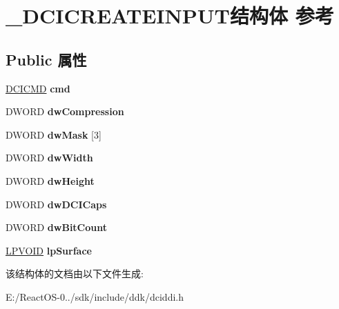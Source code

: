\hypertarget{struct___d_c_i_c_r_e_a_t_e_i_n_p_u_t}{}\section{\+\_\+\+D\+C\+I\+C\+R\+E\+A\+T\+E\+I\+N\+P\+U\+T结构体 参考}
\label{struct___d_c_i_c_r_e_a_t_e_i_n_p_u_t}
\subsection*{Public 属性}
\begin{DoxyCompactItemize}
\item 
\mbox{\label{struct___d_c_i_c_r_e_a_t_e_i_n_p_u_t_ae2fa387542ed63f4d42ee8bc226f98ed}} 
\hyperlink{struct___d_c_i_c_m_d}{D\+C\+I\+C\+MD} {\bfseries cmd}
\item 
\mbox{\label{struct___d_c_i_c_r_e_a_t_e_i_n_p_u_t_aa5892430dbc02bfc1d1e70083c60c351}} 
D\+W\+O\+RD {\bfseries dw\+Compression}
\item 
\mbox{\label{struct___d_c_i_c_r_e_a_t_e_i_n_p_u_t_a78a4c2394f82258990b7e3d855f6c22c}} 
D\+W\+O\+RD {\bfseries dw\+Mask} \mbox{[}3\mbox{]}
\item 
\mbox{\label{struct___d_c_i_c_r_e_a_t_e_i_n_p_u_t_a15e0887b7d9955f7eee403c45aaa1f95}} 
D\+W\+O\+RD {\bfseries dw\+Width}
\item 
\mbox{\label{struct___d_c_i_c_r_e_a_t_e_i_n_p_u_t_a2fd3ef62b558b4c7216a58c39acda747}} 
D\+W\+O\+RD {\bfseries dw\+Height}
\item 
\mbox{\label{struct___d_c_i_c_r_e_a_t_e_i_n_p_u_t_a7ec39881007a386629f003b022deaece}} 
D\+W\+O\+RD {\bfseries dw\+D\+C\+I\+Caps}
\item 
\mbox{\label{struct___d_c_i_c_r_e_a_t_e_i_n_p_u_t_ada9802880b4ef125b4b99b03c477db2a}} 
D\+W\+O\+RD {\bfseries dw\+Bit\+Count}
\item 
\mbox{\label{struct___d_c_i_c_r_e_a_t_e_i_n_p_u_t_a16a27d634b2a83c0035c02306103094d}} 
\hyperlink{interfacevoid}{L\+P\+V\+O\+ID} {\bfseries lp\+Surface}
\end{DoxyCompactItemize}


该结构体的文档由以下文件生成\+:\begin{DoxyCompactItemize}
\item 
E\+:/\+React\+O\+S-\/0../sdk/include/ddk/dciddi.\+h\end{DoxyCompactItemize}
